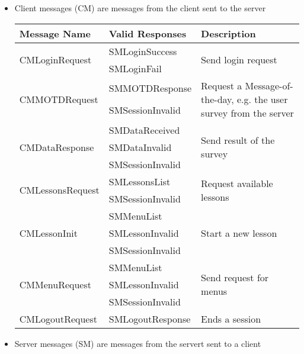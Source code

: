 \documentclass{scrartcl}
\begin{document}
\begin{itemize}
\item Client messages (CM) are messages from the client sent to the server

  \begin{tabular}{llp{}}
    Message Name                      & Valid Responses   & Description \\
    \hline
    \multirow{2}{*}{CMLoginRequest}   & SMLoginSuccess & \multirow{2}{*}{Send login request} \\
                                      & SMLoginFail \\
    \hline
    \multirow{2}{*}{CMMOTDRequest}    & SMMOTDResponse    & \multirow{2}{0.6\textwidth}{Request a Message-of-the-day, e.g. the user survey from the server} \\
                                      & SMSessionInvalid \\
    \hline
    \multirow{3}{*}{CMDataResponse}   & SMDataReceived    & \multirow{3}{*}{Send result of the survey} \\
                                      & SMDataInvalid \\
                                      & SMSessionInvalid \\
    \hline
    \multirow{2}{*}{CMLessonsRequest} & SMLessonsList     & \multirow{2}{*}{Request available lessons} \\
                                      & SMSessionInvalid \\
    \hline
    \multirow{3}{*}{CMLessonInit}     & SMMenuList     & \multirow{3}{*}{Start a new lesson} \\
                                      & SMLessonInvalid \\
                                      & SMSessionInvalid \\
    \hline
    \multirow{3}{*}{CMMenuRequest}    & SMMenuList        & \multirow{3}{*}{Send request for menus} \\
                                      & SMLessonInvalid \\
                                      & SMSessionInvalid \\
    \hline
    CMLogoutRequest                   & SMLogoutResponse & Ends a session \\
    \hline
\end{tabular}

\item Server messages (SM) are messages from the servert sent to a client


\end{itemize}
\end{document}
